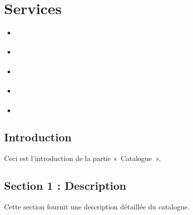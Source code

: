 \documentclass[letterpaper,10pt,french]{sphinxmanual}
\begin{document}
\section{Services}
\label{\detokenize{doc_user/services:services}}\label{\detokenize{doc_user/services::doc}}
\begin{sphinxShadowBox}
\begin{itemize}
\item {} 
\sphinxAtStartPar
{}\label{\detokenize{doc_user/services:id1}}{\hyperref[\detokenize{doc_user/services:introduction}]{}}

\item {} 
\sphinxAtStartPar
{}\label{\detokenize{doc_user/services:id2}}{\hyperref[\detokenize{doc_user/services:section-1-description}]{}}

\item {} 
\sphinxAtStartPar
{}\label{\detokenize{doc_user/services:id3}}{\hyperref[\detokenize{doc_user/services:section-2-fonctionnalites}]{}}

\item {} 
\sphinxAtStartPar
{}\label{\detokenize{doc_user/services:id4}}{\hyperref[\detokenize{doc_user/services:section-3-utilisation}]{}}

\item {} 
\sphinxAtStartPar
{}\label{\detokenize{doc_user/services:id5}}{\hyperref[\detokenize{doc_user/services:section-4-conseils-et-astuces}]{}}

\end{itemize}
\end{sphinxShadowBox}


\subsection{Introduction}
\label{\detokenize{doc_user/services:introduction}}
\sphinxAtStartPar
Ceci est l’introduction de la partie « Catalogue ».


\subsection{Section 1 : Description}
\label{\detokenize{doc_user/services:section-1-description}}
\sphinxAtStartPar
Cette section fournit une description détaillée du catalogue.
\end{document}
